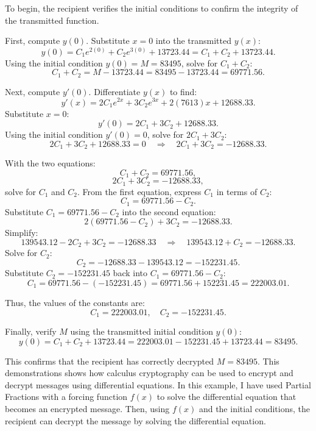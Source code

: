 \documentclass[12pt]{article}
\begin{document}
\vspace{0.1in}

To begin, the recipient verifies the initial conditions to confirm the integrity of the transmitted function.

\vspace{0.1in}

\centering First, compute \( y(0) \). Substitute \( x = 0 \) into the transmitted \( y(x) \):
\[
y(0) = C_1e^{2(0)} + C_2e^{3(0)} + 13723.44 = C_1 + C_2 + 13723.44.
\]
Using the initial condition \( y(0) = M = 83495 \), solve for \( C_1 + C_2 \):
\[
C_1 + C_2 = M - 13723.44 = 83495 - 13723.44 = 69771.56.
\]

Next, compute \( y'(0) \). Differentiate \( y(x) \) to find:
\[
y'(x) = 2C_1e^{2x} + 3C_2e^{3x} + 2(7613)x + 12688.33.
\]
Substitute \( x = 0 \):
\[
y'(0) = 2C_1 + 3C_2 + 12688.33.
\]
Using the initial condition \( y'(0) = 0 \), solve for \( 2C_1 + 3C_2 \):
\[
2C_1 + 3C_2 + 12688.33 = 0 \quad \Rightarrow \quad 2C_1 + 3C_2 = -12688.33.
\]

\vspace{0.1in}

With the two equations:
\[
C_1 + C_2 = 69771.56,
\]
\[
2C_1 + 3C_2 = -12688.33,
\]
solve for \( C_1 \) and \( C_2 \). From the first equation, express \( C_1 \) in terms of \( C_2 \):
\[
C_1 = 69771.56 - C_2.
\]
Substitute \( C_1 = 69771.56 - C_2 \) into the second equation:
\[
2(69771.56 - C_2) + 3C_2 = -12688.33.
\]
Simplify:
\[
139543.12 - 2C_2 + 3C_2 = -12688.33 \quad \Rightarrow \quad 139543.12 + C_2 = -12688.33.
\]
Solve for \( C_2 \):
\[
C_2 = -12688.33 - 139543.12 = -152231.45.
\]
Substitute \( C_2 = -152231.45 \) back into \( C_1 = 69771.56 - C_2 \):
\[
C_1 = 69771.56 - (-152231.45) = 69771.56 + 152231.45 = 222003.01.
\]

Thus, the values of the constants are:
\[
C_1 = 222003.01, \quad C_2 = -152231.45.
\]

\vspace{0.1in}

Finally, verify \( M \) using the transmitted initial condition \( y(0) \):
\[
y(0) = C_1 + C_2 + 13723.44 = 222003.01 - 152231.45 + 13723.44 = 83495.
\]

\raggedright
\setlength{\parindent}{0.5in} %

This confirms that the recipient has correctly decrypted \( M = 83495 \). This demonstrations shows how calculus cryptography can be used to encrypt and decrypt messages using differential equations. In this example, I have used Partial Fractions with a forcing function \( f(x) \) to solve the differential equation that becomes an encrypted message. Then, using \( f(x) \) and the initial conditions, the recipient can decrypt the message by solving the differential equation.
\end{document}
